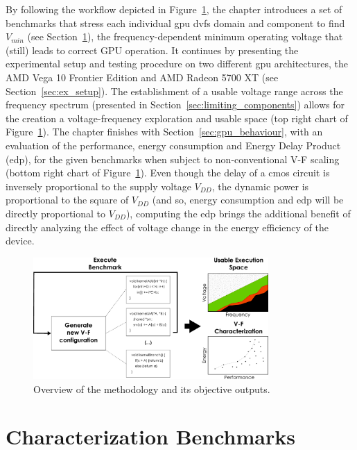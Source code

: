 By following the workflow depicted in Figure~\ref{fig:gpu_char}, the chapter introduces a set of benchmarks that stress each individual \acrshort{gpu} \acrshort{dvfs} domain and component to find $V_{min}$ (see Section~\ref{sec:char_meth}), the frequency-dependent minimum operating voltage that (still) leads to correct GPU operation. It continues by presenting the experimental setup and testing procedure on two different \acrshort{gpu} architectures, the AMD Vega 10 Frontier Edition and AMD Radeon 5700 XT (see Section~\ref{sec:ex_setup}). The establishment of a usable voltage range across the frequency spectrum (presented in Section~\ref{sec:limiting_components}) allows for the creation a voltage-frequency exploration and usable space (top right chart of Figure~\ref{fig:gpu_char}). The chapter finishes with Section~\ref{sec:gpu_behaviour}, with an evaluation of the performance, energy consumption and Energy Delay Product (\acrshort{edp}), for the given benchmarks when subject to non-conventional V-F scaling (bottom right chart of Figure~\ref{fig:gpu_char}). 
Even though the delay of a \acrshort{cmos} circuit is inversely proportional to the supply voltage $V_{DD}$, the dynamic power is proportional to the square of $V_{DD}$ (and so, energy consumption and \acrshort{edp} will be directly proportional to $V_{DD}$), computing the \acrshort{edp} brings the additional benefit of directly analyzing the effect of voltage change in the energy efficiency of the device.

\begin{figure}[htb]
  \centering
  \includegraphics[width=0.8\textwidth]{Figures/GPU_characterization/gpu_char.pdf}
  \caption{Overview of the methodology and its objective outputs.}
  \label{fig:gpu_char}
\end{figure}




\section{Characterization Benchmarks}
\label{sec:char_meth}

